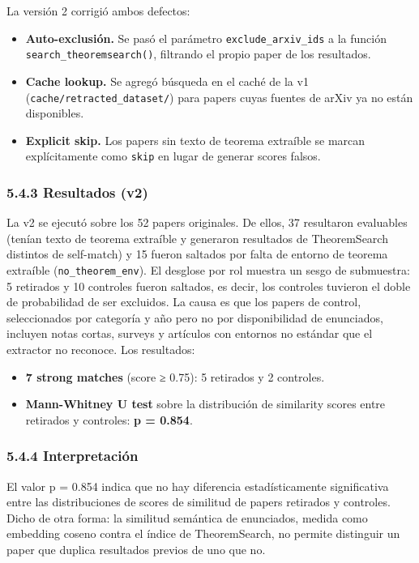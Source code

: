 \documentclass[12pt,a4paper]{article}
\theoremstyle{remark}
\begin{document}
La versión 2 corrigió ambos defectos:

\begin{itemize}
\item \textbf{Auto-exclusión.} Se pasó el parámetro \texttt{exclude\_arxiv\_ids} a la función \texttt{search\_theoremsearch()}, filtrando el propio paper de los resultados.
\item \textbf{Cache lookup.} Se agregó búsqueda en el caché de la v1 (\texttt{cache/retracted\_dataset/}) para papers cuyas fuentes de arXiv ya no están disponibles.
\item \textbf{Explicit skip.} Los papers sin texto de teorema extraíble se marcan explícitamente como \texttt{skip} en lugar de generar scores falsos.
\end{itemize}


\subsubsection{5.4.3 Resultados (v2)}

La v2 se ejecutó sobre los 52 papers originales. De ellos, 37 resultaron evaluables (tenían texto de teorema extraíble y generaron resultados de TheoremSearch distintos de self-match) y 15 fueron saltados por falta de entorno de teorema extraíble (\texttt{no\_theorem\_env}). El desglose por rol muestra un sesgo de submuestra: 5 retirados y 10 controles fueron saltados, es decir, los controles tuvieron el doble de probabilidad de ser excluidos. La causa es que los papers de control, seleccionados por categoría y año pero no por disponibilidad de enunciados, incluyen notas cortas, surveys y artículos con entornos no estándar que el extractor no reconoce. Los resultados:

\begin{itemize}
\item \textbf{7 strong matches} (score ≥ 0.75): 5 retirados y 2 controles.
\item \textbf{Mann-Whitney U test} sobre la distribución de similarity scores entre retirados y controles: \textbf{p = 0.854}.
\end{itemize}


\subsubsection{5.4.4 Interpretación}

El valor p = 0.854 indica que no hay diferencia estadísticamente significativa entre las distribuciones de scores de similitud de papers retirados y controles. Dicho de otra forma: la similitud semántica de enunciados, medida como embedding coseno contra el índice de TheoremSearch, no permite distinguir un paper que duplica resultados previos de uno que no.
\end{document}

